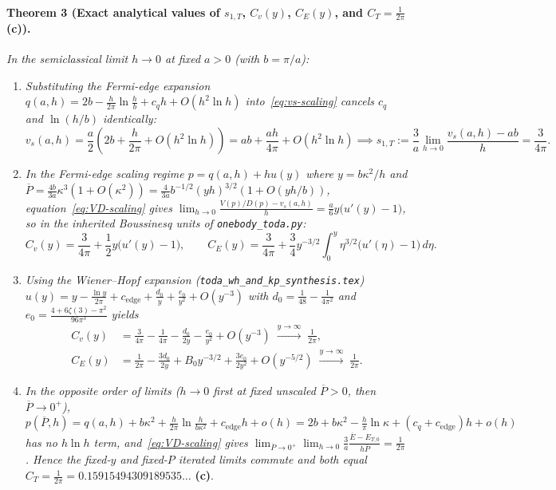 \documentclass[11pt,a4paper]{article}
\newcommand{\claim}[1]{\textbf{(#1)}}
\begin{document}
\paragraph{Theorem 3 (Exact analytical values of $s_{1,T}$, $C_v(y)$, $C_E(y)$, and $C_T = \frac{1}{2\pi}$ \claim{c}).}
\emph{In the semiclassical limit $h\to 0$ at fixed $a>0$ (with $b = \pi/a$):}
\begin{enumerate}
  \item \emph{Substituting the Fermi-edge expansion $q(a,h) = 2b - \frac{h}{2\pi}\ln\frac{h}{b} + c_q h + O(h^2\ln h)$
  into~\eqref{eq:vs-scaling} cancels $c_q$ and $\ln(h/b)$ identically:}
  \begin{equation}
    v_s(a,h) = \frac{a}{2}\left(2b + \frac{h}{2\pi} + O(h^2\ln h)\right)
    = ab + \frac{ah}{4\pi} + O(h^2\ln h)
    \implies s_{1,T} := \frac{3}{a}\lim_{h\to 0}\frac{v_s(a,h)-ab}{h} = \frac{3}{4\pi}.
    \label{eq:s1T-exact}
  \end{equation}
  \item \emph{In the Fermi-edge scaling regime $p = q(a,h) + h u(y)$ where $y = b\kappa^2/h$ and
  $\overline{P} = \frac{4b}{3a}\kappa^3(1+O(\kappa^2)) = \frac{4}{3a}b^{-1/2}(yh)^{3/2}(1+O(yh/b))$,
  equation~\eqref{eq:VD-scaling} gives $\lim_{h\to 0}\frac{V(p)/D(p) - v_s(a,h)}{h} = \frac{a}{6}y\bigl(u'(y)-1\bigr)$,
  so in the inherited Boussinesq units of \texttt{onebody\_toda.py}:}
  \begin{equation}
    C_v(y) = \frac{3}{4\pi} + \frac{1}{2}y\bigl(u'(y)-1\bigr), \qquad
    C_E(y) = \frac{3}{4\pi} + \frac{3}{4}y^{-3/2}\int_0^y \eta^{3/2}\bigl(u'(\eta)-1\bigr)\,d\eta.
    \label{eq:Cv-CE-exact}
  \end{equation}
  \item \emph{Using the Wiener--Hopf expansion (\texttt{toda\_wh\_and\_kp\_synthesis.tex})
  $u(y) = y - \frac{\ln y}{2\pi} + c_{\mathrm{edge}} + \frac{d_0}{y} + \frac{e_0}{y^2} + O(y^{-3})$
  with $d_0 = \frac{1}{48} - \frac{1}{4\pi^2}$ and $e_0 = \frac{4+6\zeta(3)-\pi^2}{96\pi^3}$ yields}
  \begin{align}
    C_v(y) &= \frac{3}{4\pi} - \frac{1}{4\pi} - \frac{d_0}{2y} - \frac{e_0}{y^2} + O(y^{-3})
    \;\xrightarrow{y\to\infty}\; \frac{1}{2\pi},
    \label{eq:Cv-asymp} \\
    C_E(y) &= \frac{1}{2\pi} - \frac{3d_0}{2y} + B_0 y^{-3/2} + \frac{3e_0}{2y^2} + O(y^{-5/2})
    \;\xrightarrow{y\to\infty}\; \frac{1}{2\pi}.
    \label{eq:CE-asymp}
  \end{align}
  \item \emph{In the opposite order of limits ($h\to 0$ first at fixed unscaled $\overline{P}>0$, then $\overline{P}\to 0^+$),
  $p(\overline{P},h) = q(a,h) + b\kappa^2 + \frac{h}{2\pi}\ln\frac{h}{b\kappa^2} + c_{\mathrm{edge}}h + o(h)
  = 2b + b\kappa^2 - \frac{h}{\pi}\ln\kappa + (c_q+c_{\mathrm{edge}})h + o(h)$ has no $h\ln h$ term, and~\eqref{eq:VD-scaling}
  gives $\lim_{\overline{P}\to 0^+}\lim_{h\to 0}\frac{3}{a}\frac{\overline{E}-E_{T,0}}{h\overline{P}} = \frac{1}{2\pi}$.
  Hence the fixed-$y$ and fixed-$P$ iterated limits commute and both equal $C_T = \frac{1}{2\pi} = 0.15915494309189535\dots$} \claim{c}.
\end{enumerate}
\end{document}
